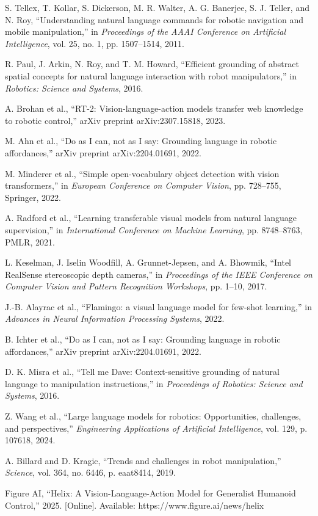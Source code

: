 \documentclass[conference]{IEEEtran}
\begin{document}
\begin{thebibliography}{00}
 S. Tellex, T. Kollar, S. Dickerson, M. R. Walter, A. G. Banerjee, S. J. Teller, and N. Roy, ``Understanding natural language commands for robotic navigation and mobile manipulation,'' in \textit{Proceedings of the AAAI Conference on Artificial Intelligence}, vol. 25, no. 1, pp. 1507--1514, 2011.

 R. Paul, J. Arkin, N. Roy, and T. M. Howard, ``Efficient grounding of abstract spatial concepts for natural language interaction with robot manipulators,'' in \textit{Robotics: Science and Systems}, 2016.

 A. Brohan et al., ``RT-2: Vision-language-action models transfer web knowledge to robotic control,'' arXiv preprint arXiv:2307.15818, 2023.

 M. Ahn et al., ``Do as I can, not as I say: Grounding language in robotic affordances,'' arXiv preprint arXiv:2204.01691, 2022.

 M. Minderer et al., ``Simple open-vocabulary object detection with vision transformers,'' in \textit{European Conference on Computer Vision}, pp. 728--755, Springer, 2022.

 A. Radford et al., ``Learning transferable visual models from natural language supervision,'' in \textit{International Conference on Machine Learning}, pp. 8748--8763, PMLR, 2021.

 L. Keselman, J. Iselin Woodfill, A. Grunnet-Jepsen, and A. Bhowmik, ``Intel RealSense stereoscopic depth cameras,'' in \textit{Proceedings of the IEEE Conference on Computer Vision and Pattern Recognition Workshops}, pp. 1--10, 2017.

 J.-B. Alayrac et al., ``Flamingo: a visual language model for few-shot learning,'' in \textit{Advances in Neural Information Processing Systems}, 2022.

 B. Ichter et al., ``Do as I can, not as I say: Grounding language in robotic affordances,'' arXiv preprint arXiv:2204.01691, 2022.

 D. K. Misra et al., ``Tell me Dave: Context-sensitive grounding of natural language to manipulation instructions,'' in \textit{Proceedings of Robotics: Science and Systems}, 2016.

 Z. Wang et al., ``Large language models for robotics: Opportunities, challenges, and perspectives,'' \textit{Engineering Applications of Artificial Intelligence}, vol. 129, p. 107618, 2024.

 A. Billard and D. Kragic, ``Trends and challenges in robot manipulation,'' \textit{Science}, vol. 364, no. 6446, p. eaat8414, 2019.

 Figure AI, ``Helix: A Vision-Language-Action Model for Generalist Humanoid Control,'' 2025. [Online]. Available: https://www.figure.ai/news/helix

\end{thebibliography}
\end{document}
